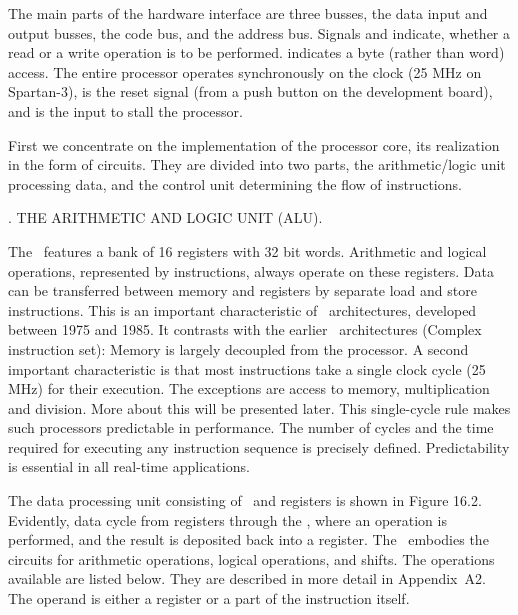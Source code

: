 The main parts of the hardware interface are three busses, the data input and output busses, the code bus, and the address bus. Signals  and  indicate, whether a read or a write operation is to be performed.  indicates a byte (rather than word) access. The entire processor operates synchronously on the clock  (25 MHz on Spartan-3),  is the reset signal (from a push button on the development board), and  is the input to stall the processor.


First we concentrate on the implementation of the processor core, its realization in the form of circuits. They are divided into two parts, the arithmetic/logic unit processing data, and the control unit determining the flow of instructions.

. THE ARITHMETIC AND LOGIC UNIT (ALU).

The \ALU\ features a bank of 16 registers with 32 bit words. Arithmetic and logical operations, represented by instructions, always operate on these registers. Data can be transferred between memory and registers by separate load and store instructions. This is an important characteristic of \RISC\ architectures, developed between 1975 and 1985. It contrasts with the earlier \CISC\ architectures (Complex instruction set): Memory is largely decoupled from the processor. A second important characteristic is that most instructions take a single clock cycle (25 MHz) for their execution. The exceptions are access to memory, multiplication and division. More about this will be presented later. This single-cycle rule makes such processors predictable in performance. The number of cycles and the time required for executing any instruction sequence is precisely defined. Predictability is essential in all real-time applications.

The data processing unit consisting of \ALU\ and registers is shown in Figure 16.2. Evidently, data cycle from registers through the \ALU, where an operation is performed, and the result is deposited back into a register. The \ALU\ embodies the circuits for arithmetic operations, logical operations, and shifts. The operations available are listed below. They are described in more detail in Appendix~A2. The operand  is either a register or a part of the instruction itself.

